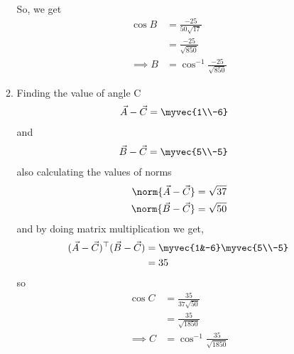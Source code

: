 \documentclass[11pt]{book}
\begin{document}
\begin{enumerate}[label=\thesection.\arabic*.,ref=\thesection.\theenumi]
\begin{enumerate}
\begin{align}
\begin{split}
\end{split}
\end{align}
So, we get 
\begin{align}
	\cos{B} &= \frac{-25}{{50} \sqrt{17}}\\
 &= \frac{-25}{\sqrt{850}}\\
 \implies B& = \cos^{-1}{\frac{-25}{\sqrt{850}}}
\end{align}
\item Finding the value of angle C
\begin{align}
 \vec{A}-\vec{C} &=\myvec{1\\-6}
\end{align}
and 
\begin{align}
 \vec{B}-\vec{C} &= \myvec{5\\-5}
\end{align}
also calculating the values of norms
\begin{align}
 \norm{\vec{A}-\vec{C}} &= \sqrt{37}\\
	\norm{\vec{B}-\vec{C}} &= \sqrt{50}
\end{align}
and by doing matrix multiplication we get,
\begin{align}
\begin{split}
 (\vec{A}-\vec{C})^{\top}(\vec{B}-\vec{C}) &= \myvec{1&-6}\myvec{5\\-5}\\
 &= 35
\end{split}
\end{align}
so 
\begin{align}
	\cos{C} &= \frac{35}{{37} \sqrt{50}}\\
 &= \frac{35}{\sqrt{1850}}\\
 \implies C &= \cos^{-1}{\frac{35}{\sqrt{1850}}}
\end{align}
\end{enumerate}
\latexprintindex
\end{enumerate}
\end{document}
